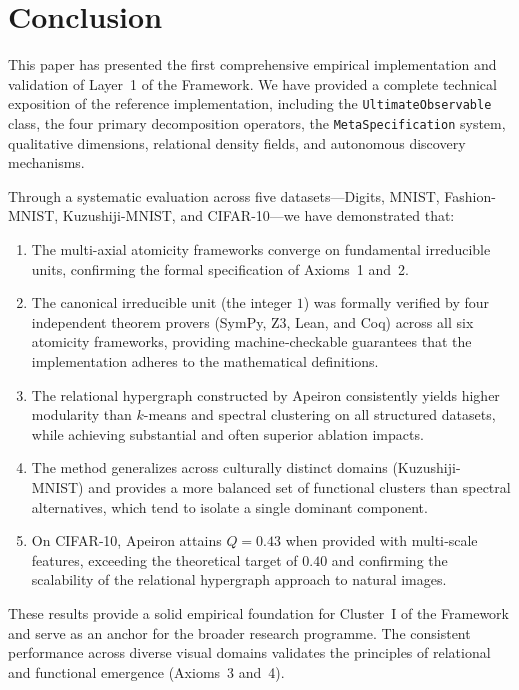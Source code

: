 \clearpage
\section{Conclusion}
\label{sec:conclusion}

This paper has presented the first comprehensive empirical implementation and validation of Layer~1 of the \Apeiron{} Framework. We have provided a complete technical exposition of the reference implementation, including the \texttt{UltimateObservable} class, the four primary decomposition operators, the \texttt{MetaSpecification} system, qualitative dimensions, relational density fields, and autonomous discovery mechanisms.

Through a systematic evaluation across five datasets—Digits, MNIST, Fashion-MNIST, Kuzushiji-MNIST, and CIFAR-10—we have demonstrated that:

\begin{enumerate}
    \item The multi-axial atomicity frameworks converge on fundamental irreducible units, confirming the formal specification of Axioms~1 and~2.
    \item The canonical irreducible unit (the integer $1$) was formally verified by four independent theorem provers (SymPy, Z3, Lean, and Coq) across all six atomicity frameworks, providing machine‑checkable guarantees that the implementation adheres to the mathematical definitions.
    \item The relational hypergraph constructed by Apeiron consistently yields higher modularity than $k$-means and spectral clustering on all structured datasets, while achieving substantial and often superior ablation impacts.
    \item The method generalizes across culturally distinct domains (Kuzushiji-MNIST) and provides a more balanced set of functional clusters than spectral alternatives, which tend to isolate a single dominant component.
    \item On CIFAR‑10, Apeiron attains $Q = 0.43$ when provided with multi‑scale features, exceeding the theoretical target of $0.40$ and confirming the scalability of the relational hypergraph approach to natural images.
\end{enumerate}

These results provide a solid empirical foundation for Cluster~I of the \Apeiron{} Framework and serve as an anchor for the broader research programme. The consistent performance across diverse visual domains validates the principles of relational and functional emergence (Axioms~3 and~4).

